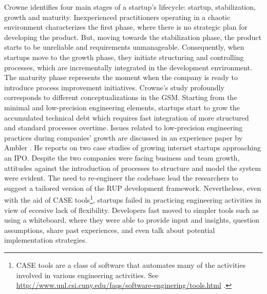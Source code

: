 \documentclass[10pt,journal,letterpaper,compsoc]{IEEEtran}
\begin{document}
Crowne \cite{Crowne2002} identifies four main stages of a startup's lifecycle: 
startup, stabilization, growth and maturity. Inexperienced practitioners 
operating in a chaotic environment characterizes the first phase, where there is 
no strategic plan for developing the product. But, moving towards the 
stabilization phase, the product starts to be unreliable and requirements 
unmanageable. Consequently, when startups move to the growth phase, they 
initiate structuring and controlling processes, which are incrementally 
integrated in the development environment. The maturity phase represents the 
moment when the company is ready to introduce process improvement initiatives. 
Crowne's study profoundly corresponds to different conceptualizations in the 
GSM. Starting from the minimal and low-precision engineering elements, startups 
start to grow the accumulated technical debt which requires fast integration of 
more structured and standard processes overtime.
Issues related to low-precision engineering practices during companies' growth 
are discussed in an experience paper by Ambler \cite{Ambler2002}. He reports on 
two case studies of growing internet startups approaching an IPO. %
Despite the two companies were facing business and team growth, attitudes 
against the introduction of processes to structure and model the system were 
evident. The need to re-engineer the codebase lead the researchers to suggest a 
tailored version of the RUP %
development framework. Nevertheless, even with the aid of CASE 
tools\footnote{CASE tools are a class of software that automates many of the 
activities involved in various engineering activities. See 
\url{http://www.unl.csi.cuny.edu/faqs/software-enginering/tools.html} .}, 
startups failed in practicing engineering activities in view of eccesive lack of 
flexibility. Developers fast moved to simpler tools such as using a whiteboard, 
where they were able to provide input and insights, question assumptions, share 
past experiences, and even talk about potential implementation strategies. 
\end{document}
